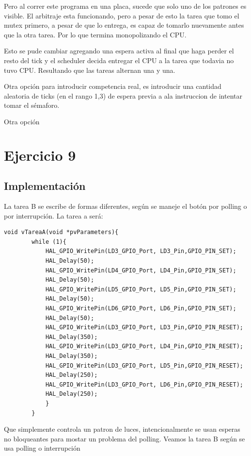 \documentclass[12pt]{article}
\begin{document}
Pero al correr este programa en una placa,
sucede que solo uno de los patrones es visible.
El arbitraje esta funcionando, pero a pesar de esto
la tarea que tomo el mutex primero, a pesar de que lo entrega,
es capaz de tomarlo nuevamente antes que la otra tarea.
Por lo que termina monopolizando el CPU.

Esto se pude cambiar agregando una espera activa al final
que haga perder el resto del tick y el scheduler decida
entregar el CPU a la tarea que todavia no tuvo CPU. Resultando 
que las tareas alternan una y una.

Otra opción para introducir competencia real, es introducir
una cantidad aleatoria de ticks (en el rango 1,3) de espera
previa a ala instruccion de intentar tomar el sémaforo.


Otra opción



\section{Ejercicio 9}
\subsection{Implementación}
La tarea B se escribe de formas diferentes, según
se maneje el botón por polling o por interrupción.
La tarea a será:
\begin{lstlisting}[style=CStyle]
    void vTareaA(void *pvParameters){
        while (1){
            HAL_GPIO_WritePin(LD3_GPIO_Port, LD3_Pin,GPIO_PIN_SET);
            HAL_Delay(50);
            HAL_GPIO_WritePin(LD4_GPIO_Port, LD4_Pin,GPIO_PIN_SET);
            HAL_Delay(50);
            HAL_GPIO_WritePin(LD5_GPIO_Port, LD5_Pin,GPIO_PIN_SET);
            HAL_Delay(50);
            HAL_GPIO_WritePin(LD6_GPIO_Port, LD6_Pin,GPIO_PIN_SET);
            HAL_Delay(50);
            HAL_GPIO_WritePin(LD3_GPIO_Port, LD3_Pin,GPIO_PIN_RESET);
            HAL_Delay(350);
            HAL_GPIO_WritePin(LD3_GPIO_Port, LD4_Pin,GPIO_PIN_RESET);
            HAL_Delay(350);
            HAL_GPIO_WritePin(LD3_GPIO_Port, LD5_Pin,GPIO_PIN_RESET);
            HAL_Delay(250);
            HAL_GPIO_WritePin(LD3_GPIO_Port, LD6_Pin,GPIO_PIN_RESET);
            HAL_Delay(250);
            }
        }
    \end{lstlisting}
    Que simplemente controla un patron de luces, intencionalmente
    se usan esperas no bloqueantes para mostar un problema 
    del polling. Veamos
    la tarea B según se usa polling o interrupción
    
\end{document}
